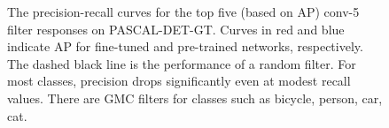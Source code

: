 
\begin{figure}[t!]
\centering
\caption{The precision-recall curves for the top five (based on AP) conv-5 filter responses on PASCAL-DET-GT. Curves in red and blue indicate AP for fine-tuned and pre-trained networks, respectively. The dashed black line is the performance of a random filter. For most classes, precision drops significantly even at modest recall values. There are GMC filters for classes such as bicycle, person, car, cat.}
\label{fig:ap}
\end{figure}


